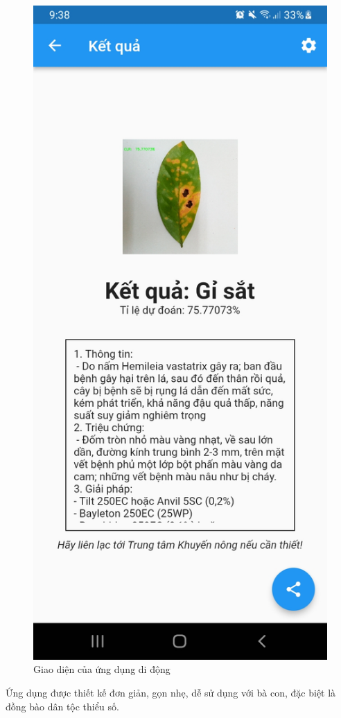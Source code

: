 \documentclass[a4paper,14pt]{extarticle}
\begin{document}
\begin{figure}[H]
		\includegraphics[scale=0.1]{images/screenshot4.jpg}
		\caption{Giao diện của ứng dụng di động}
	\end{figure}

	Ứng dụng được thiết kế đơn giản, gọn nhẹ, dễ sử dụng với bà con, đặc biệt là đồng bào dân tộc thiểu số.
\end{document}
